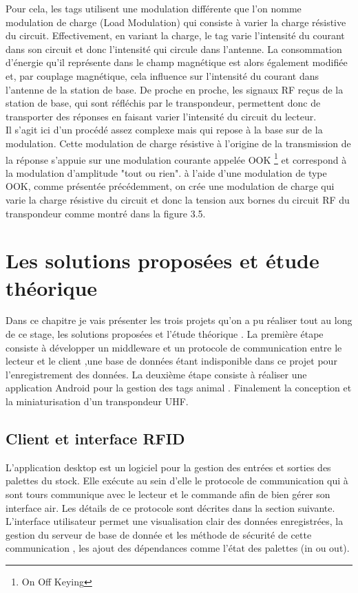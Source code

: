 \documentclass[11pt, a4paper, twoside]{book}
\begin{document}
Pour cela, les tags utilisent une modulation différente que l'on nomme modulation de charge (Load Modulation) qui consiste à varier la charge résistive du circuit. Effectivement, en variant la charge, le tag  varie l'intensité du courant dans son circuit et donc l'intensité qui circule dans l'antenne. La consommation d'énergie qu'il représente dans le champ magnétique est alors également modifiée et, par couplage magnétique, cela influence sur l'intensité du courant dans l'antenne de la station de base. De proche en proche, les signaux RF reçus de la station de base, qui sont réfléchis par le transpondeur, permettent donc de transporter des réponses en faisant varier l'intensité du circuit du lecteur.\\

Il s'agit ici d'un procédé assez complexe mais qui repose à la base sur de la modulation. Cette modulation de charge résistive à l'origine de la transmission de la réponse s'appuie sur une modulation courante appelée OOK \footnote{On Off Keying} et correspond à la modulation d'amplitude "tout ou rien". à l'aide d'une modulation de type OOK, comme présentée précédemment, on crée une modulation de charge qui  varie la charge résistive du circuit et donc la tension aux bornes du circuit RF du transpondeur comme montré dans la figure 3.5.\\
\chapter{Les solutions proposées et étude théorique }
Dans ce chapitre je vais présenter les trois projets qu'on a pu réaliser tout au long de ce stage, les solutions proposées et l'étude théorique . La première étape consiste à développer un middleware et un protocole de communication entre le lecteur et le client ,une base de données étant indisponible dans ce projet pour l'enregistrement des données. La deuxième étape consiste à réaliser une application Android pour la gestion des tags animal . Finalement la conception et la miniaturisation d'un transpondeur UHF.
\section{Client et interface RFID}

L'application desktop  est un logiciel pour la gestion des entrées et sorties des palettes du stock. Elle exécute au sein d'elle le protocole de communication  qui à sont tours communique avec le lecteur et le commande  afin de bien gérer son interface air. Les détails de ce protocole sont décrites dans la section suivante. L'interface utilisateur  permet  une visualisation clair des données enregistrées, la gestion du serveur de base de donnée et les méthode de sécurité de cette communication , les ajout des dépendances comme l'état des palettes (in ou out).\\
\end{document}
